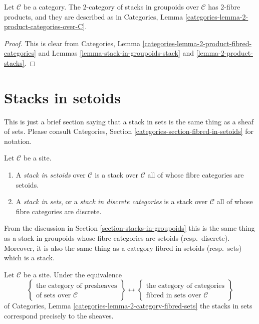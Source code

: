 \begin{lemma}
\label{lemma-2-product-stacks-in-groupoids}
Let $\mathcal{C}$ be a category.
The $2$-category of stacks in groupoids over $\mathcal{C}$
has 2-fibre products, and they are described as in
Categories, Lemma \ref{categories-lemma-2-product-categories-over-C}.
\end{lemma}

\begin{proof}
This is clear from
Categories, Lemma \ref{categories-lemma-2-product-fibred-categories}
and Lemmas \ref{lemma-stack-in-groupoids-stack}
and \ref{lemma-2-product-stacks}.
\end{proof}








\section{Stacks in setoids}
\label{section-stacks-in-setoids}

\noindent
This is just a brief section saying that a stack in sets
is the same thing as a sheaf of sets. Please consult
Categories, Section \ref{categories-section-fibred-in-setoids}
for notation.

\begin{definition}
\label{definition-stack-in-sets}
Let $\mathcal{C}$ be a site.
\begin{enumerate}
\item A {\it stack in setoids} over $\mathcal{C}$
is a stack over $\mathcal{C}$ all of whose fibre categories are
setoids.
\item A {\it stack in sets}, or a {\it stack in discrete categories}
is a stack over $\mathcal{C}$ all of whose fibre categories are discrete.
\end{enumerate}
\end{definition}

\noindent
From the discussion in
Section \ref{section-stacks-in-groupoids}
this is the same thing as a stack in groupoids whose fibre categories
are setoids (resp.\ discrete). Moreover, it is also the same thing
as a category fibred in setoids (resp.\ sets) which is a stack.

\begin{lemma}
\label{lemma-when-stack-in-sets}
Let $\mathcal{C}$ be a site. Under the equivalence
$$
\left\{
\begin{matrix}
\text{the category of presheaves}\\
\text{of sets over }\mathcal{C}
\end{matrix}
\right\}
\leftrightarrow
\left\{
\begin{matrix}
\text{the category of categories}\\
\text{fibred in sets over }\mathcal{C}
\end{matrix}
\right\}
$$
of
Categories, Lemma \ref{categories-lemma-2-category-fibred-sets}
the stacks in sets correspond precisely to the sheaves.
\end{lemma}


